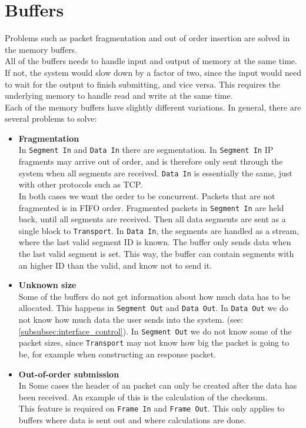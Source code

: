 \section{Buffers}
Problems such as packet fragmentation and out of order insertion are solved in
the memory buffers.\\
All of the buffers needs to handle input and output of
memory at the same time. If not, the system would slow down by a factor of two,
since the input would need to wait for the output to finish submitting, and
vice versa. This requires the underlying memory to handle read and write at the
same time. \\
Each of the memory buffers have slightly different variations. In general, there
are several problems to solve:

\begin{itemize}
    \item \textbf{Fragmentation}\\
    In \texttt{Segment In} and \texttt{Data In} there are segmentation. In
    \texttt{Segment In} IP fragments may arrive out of order, and is therefore only
    sent through the system when all segments are received. \texttt{Data In} is
    essentially the same, just with other protocols such as TCP.\\
    In both cases we want the order to be concurrent. Packets that are not
    fragmented is in FIFO order. Fragmented packets in \texttt{Segment In} are
    held back, until all segments are received. Then all data segments are sent
    as a single block to \texttt{Transport}. In \texttt{Data In}, the segments are
    handled as a stream, where the last valid segment ID is known. The buffer
    only sends data when the last valid segment is set. This way, the buffer
    can contain segments with an higher ID than the valid, and know not to send it.


    \item \textbf{Unknown size}\\
    Some of the buffers do not get information about how much data has to be
    allocated. This happens in \texttt{Segment Out} and \texttt{Data Out}.
    In \texttt{Data Out} we do not know how much data the user sends into
    the system. (see: \autoref{subsubsec:interface_control}). In
    \texttt{Segment Out} we do not know some of the packet sizes, since
    \texttt{Transport} may not know how big the packet is going to be, for
    example when constructing an response packet.


    \item \textbf{Out-of-order submission}\\
    In Some cases the header of an packet can only be created after the data
    has been received. An example of this is the calculation of the checksum.\\
    This feature is required on \texttt{Frame In} and \texttt{Frame Out}.
    This only applies to buffers where data is sent out and where calculations
    are done.


\end{itemize}
